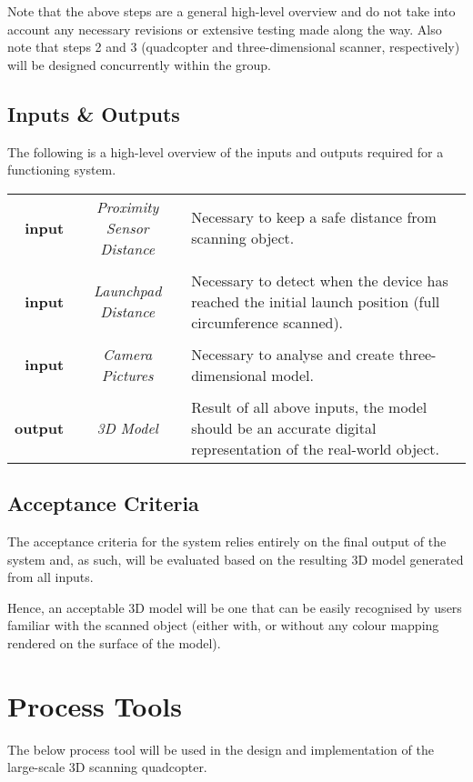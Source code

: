 \documentclass[10pt,letterpaper]{article}
\begin{document}
Note that the above steps are a general high-level overview and do not take into account any necessary revisions or extensive testing made along the way. Also note that steps 2 and 3 (quadcopter and three-dimensional scanner, respectively) will be designed concurrently within the group. 

\subsection{Inputs \& Outputs}
The following is a high-level overview of the inputs and outputs required for a functioning system. \par 

\begin{center}
	\begin{tabular}{r c p{6cm}}
		\textbf{input} & \textit{Proximity Sensor Distance} & Necessary to keep a safe distance from scanning object. \\ \\
		\textbf{input} & \textit{Launchpad Distance} & Necessary to detect when the device has reached the initial launch position (full circumference scanned). \\ \\
		\textbf{input} & \textit{Camera Pictures} & Necessary to analyse and create three-dimensional model. \\ \\
		\textbf{output} & \textit{3D Model} & Result of all above inputs, the model should be an accurate digital representation of the real-world object.
	\end{tabular}
\end{center}


\subsection{Acceptance Criteria}
The acceptance criteria for the system relies entirely on the final output of the system and, as such, will be evaluated based on the resulting 3D model generated from all inputs. \par 
Hence, an acceptable 3D model will be one that can be easily recognised by users familiar with the scanned object (either with, or without any colour mapping rendered on the surface of the model).

\newpage


\section{Process Tools}
The below process tool will be used in the design and implementation of the large-scale 3D scanning quadcopter. 
\end{document}

